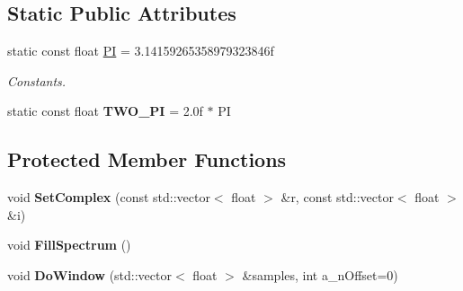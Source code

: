 \subsection*{Static Public Attributes}
\begin{DoxyCompactItemize}
\item 
\mbox{\label{class_i_fourier_transform_a228fd1ce32ae105a30421c38d8132b1a}} 
static const float \hyperlink{class_i_fourier_transform_a228fd1ce32ae105a30421c38d8132b1a}{PI} = 3.\+14159265358979323846f
\begin{DoxyCompactList}\small\item\em Constants. \end{DoxyCompactList}\item 
\mbox{\label{class_i_fourier_transform_a63a6b56e9cc2a078622329497383271d}} 
static const float {\bfseries T\+W\+O\+\_\+\+PI} = 2.\+0f $\ast$ PI
\end{DoxyCompactItemize}
\subsection*{Protected Member Functions}
\begin{DoxyCompactItemize}
\item 
\mbox{\label{class_i_fourier_transform_ae58ec6e92c7ddc0c8b6c14bfa9ee0c3b}} 
void {\bfseries Set\+Complex} (const std\+::vector$<$ float $>$ \&r, const std\+::vector$<$ float $>$ \&i)
\item 
\mbox{\label{class_i_fourier_transform_aab6befb32d6423ad9d351c6498ce279e}} 
void {\bfseries Fill\+Spectrum} ()
\item 
\mbox{\label{class_i_fourier_transform_ad66dcbdc5994f63d381d1568c5e152bd}} 
void {\bfseries Do\+Window} (std\+::vector$<$ float $>$ \&samples, int a\+\_\+n\+Offset=0)
\end{DoxyCompactItemize}
